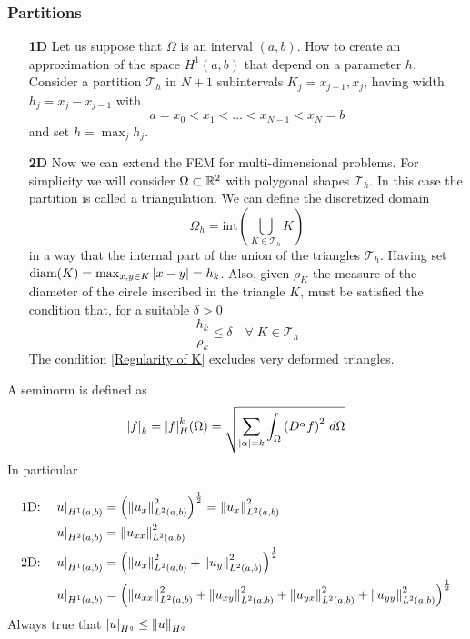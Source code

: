 \subsubsection*{Partitions}
\begin{itemize}
    \item[\textbf{1D}]
    Let us suppose that \(\Omega\) is an interval \((a,b)\). How to create an approximation of the space \(H^1(a,b)\) that depend on a parameter \(h\). Consider a partition \(\mathcal{T}_h\) in \(N+1\) subintervals \(K_j = x_{j-1}, x_j\), having width \(h_j = x_j - x_{j-1}\) with 
    \begin{equation}
        a = x_0 < x_1 < \ldots < x_{N-1} < x_N = b \label{Partition of an interval}
    \end{equation}
    and set \(h = \max_j h_j\). 
    \item[\textbf{2D}] Now we can extend the FEM for multi-dimensional problems. For simplicity we will consider \(\Omega \subset \mathbb{R}^2\) with polygonal shapes \(\mathcal{T}_h\). In this case the partition is called a triangulation. We can define the discretized domain 
    \[
        \Omega_h = \text{int}\left(\bigcup_{K \in \mathcal{T}_h} K\right)
    \]
    in a way that the internal part of the union of the triangles \(\mathcal{T}_h\). Having set \(\text{diam}(K) = \max_{x,y \in K} \abs{x-y} = h_k\). Also, given \(\rho_K\) the measure of the diameter of the circle inscribed in the triangle \(K\), must be satisfied the condition that, for a suitable \(\delta > 0\) 
    \begin{equation}
        \frac{h_k}{\rho_k} \leq \delta \quad \forall \; K \in \mathcal{T}_h \label{Regularity of K}
    \end{equation}
    The condition \eqref{Regularity of K} excludes very deformed triangles.

\end{itemize}
\begin{background}
\begin{definition}[Seminorms]
    A seminorm is defined as 
    \[
        \abs{f}_k = \abs{f}_H^k (\Omega) = \sqrt{\sum_{\abs{\alpha} = k} \int_\Omega \left(D^\alpha f\right)^2 \, d\Omega}
    \]
    In particular 

        \begin{align*}
            \text{1D:}\quad  \abs{u}_{H^1(a,b)} & = \left(\norm{u_x}^2_{L^2(a,b)}\right)^{\frac{1}{2}} = \norm{u_x}^2_{L^2(a,b)} \\
              \abs{u}_{H^2(a,b)} & = \norm{u_{xx}}^2_{L^2(a,b)} \\
            \text{2D:}\quad  \abs{u}_{H^1(a,b)} & = \left(\norm{u_x}^2_{L^2(a,b)} + \norm{u_y}^2_{L^2(a,b)}\right)^{\frac{1}{2}} \\
             \abs{u}_{H^1(a,b)} & = \left(\norm{u_{xx}}^2_{L^2(a,b)} + \norm{u_{xy}}^2_{L^2(a,b)} + \norm{u_{yx}}^2_{L^2(a,b)} +\norm{u_{yy}}^2_{L^2(a,b)}\right)^{\frac{1}{2}} \\
        \end{align*}
    Always true that \(\abs{u}_{H^q} \leq \norm{u}_{H^q}\)
\end{definition}
\end{background}
